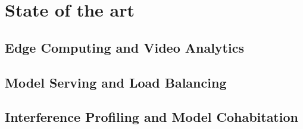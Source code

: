\setchapterpreamble[u]{\margintoc}
\chapter{State of the art}



\section{Edge Computing and Video Analytics}


\section{Model Serving and Load Balancing}


\section{Interference Profiling and Model Cohabitation}

